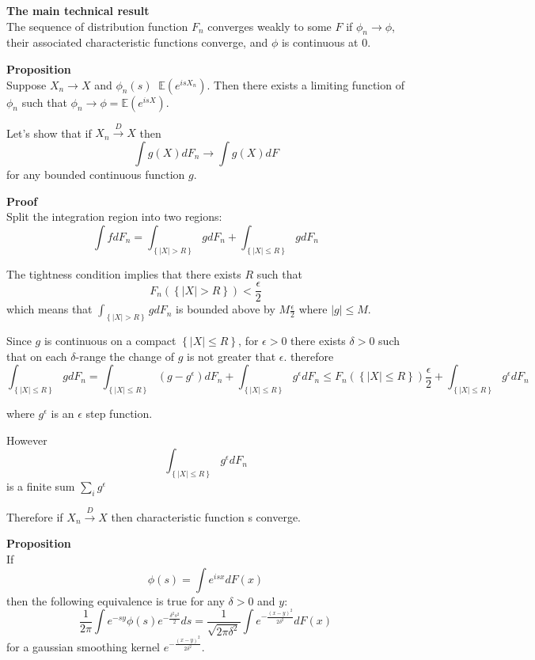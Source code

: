 \documentclass[a4paper]{article}
\newcommand{\obj}[1]{{\left\{ #1 \right \}}}
\newcommand{\brac}[1]{{\left ( #1 \right )}}
\newcommand{\abs}[1]{{\left | #1 \right |}}
\newcommand{\ex}{\mathbb{E}}
\newcommand{\defn}{\mathop{\overset{\Delta}{=}}\nolimits}
\begin{document}


\noindent \textbf{The main technical result}\hfill\\

The sequence of distribution function $F_n$ converges weakly to some $F$ if $\phi_n\to \phi$, their associated characteristic functions converge, and $\phi$ is continuous at $0$.

\noindent \textbf{Proposition}\hfill\\

Suppose $X_n\to X$ and $\phi_n(s)\defn \ex\brac{e^{isX_n}}$. Then there exists a limiting function of $\phi_n$ such that $\phi_n\to \phi = \ex\brac{e^{isX}}$.

Let's show that if $X_n\overset{D}{\to} X$ then
\[\int g(X) dF_n \to \int g(X)dF\]
for any bounded continuous function $g$.

\textbf{Proof}\hfill\\
Split the integration region into two regions:
\[\int f dF_n = \int_\obj{\abs{X}>R} g dF_n + \int_\obj{\abs{X}\leq R} g dF_n\]

The tightness condition implies that there exists $R$ such that
\[F_n\brac{\obj{\abs{X}>R}}< \frac{\epsilon}{2}\]
which means that $\int_\obj{\abs{X}>R} g dF_n$ is bounded above by $M\frac{\epsilon}{2}$ where $\abs{g}\leq M$.

Since $g$ is continuous on a compact $\obj{\abs{X}\leq R}$, for $\epsilon>0$ there exists $\delta>0$ such that on each $\delta$-range the change of $g$ is not greater that $\epsilon$.
therefore 
\[\int_\obj{\abs{X}\leq R} g dF_n = \int_\obj{\abs{X}\leq R} (g-g^\epsilon) dF_n + \int_\obj{\abs{X}\leq R} g^\epsilon dF_n \leq F_n\brac{\obj{\abs{X}\leq R}}\frac{\epsilon}{2} + \int_\obj{\abs{X}\leq R} g^\epsilon dF_n\]

where $g^\epsilon$ is an $\epsilon$ step function.

However
\[\int_\obj{\abs{X}\leq R} g^\epsilon dF_n\]
is a finite sum $\sum_i g^\epsilon$

Therefore if $X_n\overset{D}{\to} X$ then characteristic function s converge.



\noindent\textbf{Proposition} \hfill\\
If
\[\phi(s) = \int e^{isx} dF(x)\]
then the following equivalence is true for any $\delta>0$ and $y$:
\[\frac{1}{2\pi}\int e^{-sy} \phi(s) e^{-\frac{\delta^2 s^2}{2}}ds
=\frac{1}{\sqrt{2\pi\delta^2}}\int e^{-\frac{{(x-y)}^2}{2\delta^2}}dF(x)\]
for a gaussian smoothing kernel $e^{-\frac{{(x-y)}^2}{2\delta^2}}$.
\end{document}
